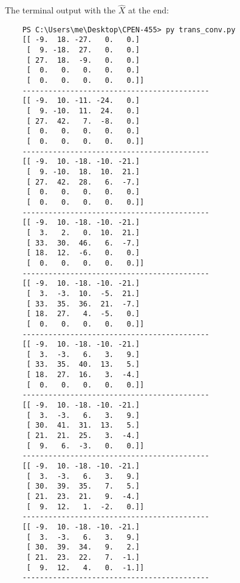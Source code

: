 \documentclass{article}
\begin{document}
{The terminal output with the $\hat{X}$ at the end:
\begin{verbatim}
    PS C:\Users\me\Desktop\CPEN-455> py trans_conv.py
    [[ -9.  18. -27.   0.   0.]
     [  9. -18.  27.   0.   0.]
     [ 27.  18.  -9.   0.   0.]
     [  0.   0.   0.   0.   0.]
     [  0.   0.   0.   0.   0.]]
    -------------------------------------------
    [[ -9.  10. -11. -24.   0.]
     [  9. -10.  11.  24.   0.]
     [ 27.  42.   7.  -8.   0.]
     [  0.   0.   0.   0.   0.]
     [  0.   0.   0.   0.   0.]]
    -------------------------------------------
    [[ -9.  10. -18. -10. -21.]
     [  9. -10.  18.  10.  21.]
     [ 27.  42.  28.   6.  -7.]
     [  0.   0.   0.   0.   0.]
     [  0.   0.   0.   0.   0.]]
    -------------------------------------------
    [[ -9.  10. -18. -10. -21.]
     [  3.   2.   0.  10.  21.]
     [ 33.  30.  46.   6.  -7.]
     [ 18.  12.  -6.   0.   0.]
     [  0.   0.   0.   0.   0.]]
    -------------------------------------------
    [[ -9.  10. -18. -10. -21.]
     [  3.  -3.  10.  -5.  21.]
     [ 33.  35.  36.  21.  -7.]
     [ 18.  27.   4.  -5.   0.]
     [  0.   0.   0.   0.   0.]]
    -------------------------------------------
    [[ -9.  10. -18. -10. -21.]
     [  3.  -3.   6.   3.   9.]
     [ 33.  35.  40.  13.   5.]
     [ 18.  27.  16.   3.  -4.]
     [  0.   0.   0.   0.   0.]]
    -------------------------------------------
    [[ -9.  10. -18. -10. -21.]
     [  3.  -3.   6.   3.   9.]
     [ 30.  41.  31.  13.   5.]
     [ 21.  21.  25.   3.  -4.]
     [  9.   6.  -3.   0.   0.]]
    -------------------------------------------
    [[ -9.  10. -18. -10. -21.]
     [  3.  -3.   6.   3.   9.]
     [ 30.  39.  35.   7.   5.]
     [ 21.  23.  21.   9.  -4.]
     [  9.  12.   1.  -2.   0.]]
    -------------------------------------------
    [[ -9.  10. -18. -10. -21.]
     [  3.  -3.   6.   3.   9.]
     [ 30.  39.  34.   9.   2.]
     [ 21.  23.  22.   7.  -1.]
     [  9.  12.   4.   0.  -1.]]
    -------------------------------------------
\end{verbatim}
}\\
\end{document}
